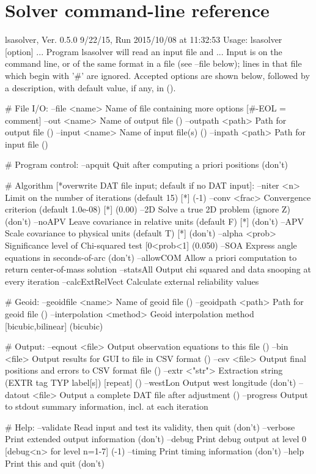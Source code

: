 \chapter{Solver command-line reference}
\label{chap:solverref}

\begin{Snippet}
lsasolver, Ver. 0.5.0 9/22/15, Run 2015/10/08 at 11:32:53
Usage: lsasolver [option] ...
 Program lsasolver will read an input file and ...
 Input is on the command line, or of the same format in a file (see --file below);
 lines in that file which begin with '#' are ignored. Accepted options are 
 shown below, followed by a description, with default value, if any, in ().

# File I/O:
 --file <name>       Name of file containing more options [#-EOL = comment]
 --out <name>        Name of output file ()
 --outpath <path>    Path for output file ()
 --input <name>      Name of input file(s) ()
 --inpath <path>     Path for input file ()

# Program control:
 --apquit            Quit after computing a priori positions (don't)

# Algorithm [*overwrite DAT file input; default if no DAT input]:
 --niter <n>         Limit on the number of iterations (default 15) [*] (-1)
 --conv <frac>       Convergence criterion (default 1.0e-08) [*] (0.00)
 --2D                Solve a true 2D problem (ignore Z) (don't)
 --noAPV             Leave covariance in relative units (default F) [*] (don't)
 --APV               Scale covariance to physical units (default T) [*] (don't)
 --alpha <prob>      Significance level of Chi-squared test [0<prob<1] (0.050)
 --SOA               Express angle equations in seconds-of-arc (don't)
 --allowCOM          Allow a priori computation to return center-of-mass solution
 --statsAll          Output chi squared and data snooping at every iteration
 --calcExtRelVect    Calculate external reliability values

# Geoid:
 --geoidfile <name>  Name of geoid file ()
 --geoidpath <path>  Path for geoid file ()
 --interpolation <method> Geoid interpolation method [bicubic,bilinear] (bicubic)

# Output:
 --eqnout <file>     Output observation equations to this file ()
 --bin <file>        Output results for GUI to file in CSV format ()
 --csv <file>        Output final positions and errors to CSV format file ()
 --extr <"str">      Extraction string (EXTR tag TYP label[s]) [repeat] ()
 --westLon           Output west longitude (don't)
 --datout <file>     Output a complete DAT file after adjustment ()
 --progress          Output to stdout summary information, incl. at each iteration

# Help:
 --validate          Read input and test its validity, then quit (don't)
 --verbose           Print extended output information (don't)
 --debug             Print debug output at level 0 [debug<n> for level n=1-7] (-1)
 --timing            Print timing information (don't)
 --help              Print this and quit (don't)
\end{Snippet}
